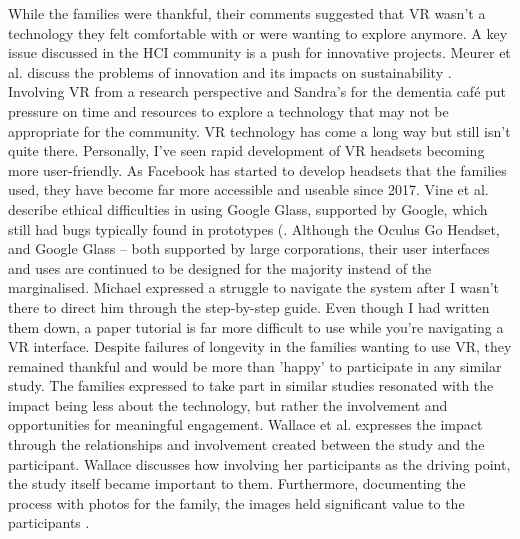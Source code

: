 While the families were thankful, their comments suggested that VR wasn't a technology they felt comfortable with or were wanting to explore anymore. A key issue discussed in the HCI community is a push for innovative projects. Meurer et al. discuss the problems of innovation and its impacts on sustainability \citep{meurer_designing_2018}. Involving VR from a research perspective and Sandra's for the dementia café put pressure on time and resources to explore a technology that may not be appropriate for the community. VR technology has come a long way but still isn't quite there. Personally, I've seen rapid development of VR headsets becoming more user-friendly. As Facebook has started to develop headsets that the families used, they have become far more accessible and useable since 2017. Vine et al. describe ethical difficulties in using Google Glass, supported by Google, which still had bugs typically found in prototypes (\citep{vines_our_2017}. Although the Oculus Go Headset, and Google Glass – both supported by large corporations, their user interfaces and uses are continued to be designed for the majority instead of the marginalised. Michael expressed a struggle to navigate the system after I wasn't there to direct him through the step-by-step guide. Even though I had written them down, a paper tutorial is far more difficult to use while you're navigating a VR interface. Despite failures of longevity in the families wanting to use VR, they remained thankful and would be more than 'happy' to participate in any similar study. The families expressed to take part in similar studies resonated with the impact being less about the technology, but rather the involvement and opportunities for meaningful engagement. Wallace et al. expresses the impact through the relationships and involvement created between the study and the participant. Wallace discusses how involving her participants as the driving point, the study itself became important to them. Furthermore, documenting the process with photos for the family, the images held significant value to the participants \citep{wallace_design-led_2013}. 


